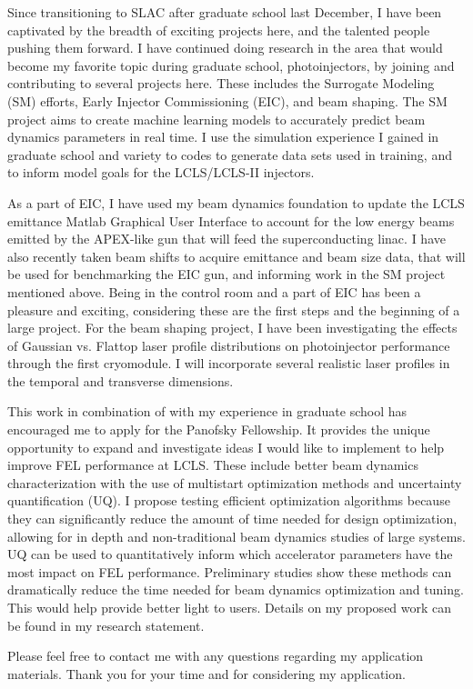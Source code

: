 Since transitioning to SLAC after graduate school last December, 
I have been captivated by the breadth of exciting projects here, 
and the talented people pushing them forward.
I have continued doing research in the area that
 would become my favorite topic during graduate school, photoinjectors, 
 by joining and contributing to several projects here. 
 These includes the Surrogate Modeling (SM) efforts, Early Injector Commissioning (EIC), and beam shaping. 
 The SM project aims to create machine learning models to accurately predict 
 beam dynamics parameters in real time. 
 I use the simulation experience I gained in graduate school and variety to codes to generate data sets used in training, 
 and to inform model goals for the LCLS/LCLS-II injectors.
 
 As a part of EIC, I have used my beam dynamics foundation to update the 
 LCLS emittance Matlab Graphical User Interface to account for the low energy beams emitted by the 
 APEX-like gun that will feed the superconducting linac. I have also recently 
 taken beam shifts to acquire emittance and beam size data, that will be used 
 for benchmarking the EIC gun, and informing work in the SM project mentioned above. 
 Being in the control room and a part of EIC has been a pleasure and exciting, 
 considering these are the first steps and the beginning of a large project.
 For the beam shaping project, I have been investigating the effects of Gaussian vs. 
 Flattop laser profile distributions on photoinjector performance through the first cryomodule. 
 I will incorporate several realistic laser profiles in the temporal and transverse dimensions. 
 
 This work in combination of with my experience in graduate school has encouraged me 
 to apply for the Panofsky Fellowship. It provides the unique opportunity to expand and investigate ideas 
 I would like to implement to help improve FEL performance at LCLS. 
 These include better beam dynamics characterization with the use of multistart optimization methods and uncertainty quantification (UQ). 
I propose testing efficient optimization algorithms because they can significantly reduce the amount of time needed for design optimization, 
 allowing for in depth and non-traditional beam dynamics studies of large systems.
 UQ can be used to quantitatively inform  which accelerator parameters have the most impact on FEL performance. 
 Preliminary studies show these methods can dramatically reduce the time needed for beam dynamics optimization and tuning. 
 This would help provide better light to users. Details on my proposed work can be found in my research statement.
 
 Please feel free to contact me with any questions regarding my application materials. Thank you for your time and for considering my application. 
 \vspace{1em}
 